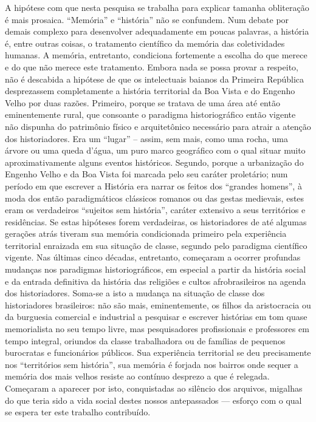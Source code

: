 A hipótese com que nesta pesquisa se trabalha para explicar tamanha obliteração é mais prosaica. ``Memória'' e ``história'' não se confundem. Num debate por demais complexo para desenvolver adequadamente em poucas palavras, a história é, entre outras coisas, o tratamento científico da memória das coletividades humanas. A memória, entretanto, condiciona fortemente a escolha do que merece e do que não merece este tratamento. Embora nada se possa provar a respeito, não é descabida a hipótese de que os intelectuais baianos da Primeira República desprezassem completamente a história territorial da Boa Vista e do Engenho Velho por duas razões. Primeiro, porque se tratava de uma área até então eminentemente rural, que consoante o paradigma historiográfico então vigente não dispunha do patrimônio físico e arquitetônico necessário para atrair a atenção dos historiadores. Era um ``lugar'' -- assim, sem mais, como uma rocha, uma árvore ou uma queda d'água, um puro marco geográfico com o qual situar muito aproximativamente alguns eventos históricos. Segundo, porque a urbanização do Engenho Velho e da Boa Vista foi marcada pelo seu caráter proletário; num período em que escrever a História era narrar os feitos dos ``grandes homens'', à moda dos então paradigmáticos clássicos romanos ou das gestas medievais, estes eram os verdadeiros ``sujeitos sem história'', caráter extensivo a seus territórios e residências. Se estas hipóteses forem verdadeiras, os historiadores de até algumas gerações atrás tiveram sua memória condicionada primeiro pela experiência territorial enraizada em sua situação de classe, segundo pelo paradigma científico vigente. Nas últimas cinco décadas, entretanto, começaram a ocorrer profundas mudanças nos paradigmas historiográficos, em especial a partir da história social e da entrada definitiva da história das religiões e cultos afrobrasileiros na agenda dos historiadores. Soma-se a isto a mudança na situação de classe dos historiadores brasileiros: não são mais, eminentemente, os filhos da aristocracia ou da burguesia comercial e industrial a pesquisar e escrever histórias em tom quase memorialista no seu tempo livre, mas pesquisadores profissionais e professores em tempo integral, oriundos da classe trabalhadora ou de famílias de pequenos burocratas e funcionários públicos. Sua experiência territorial se deu precisamente nos ``territórios sem história'', sua memória é forjada nos bairros onde sequer a memória dos mais velhos resiste ao contínuo desprezo a que é relegada. Começaram a aparecer por isto, conquistadas ao silêncio dos arquivos, migalhas do que teria sido a vida social destes nossos antepassados --- esforço com o qual se espera ter este trabalho contribuído.

